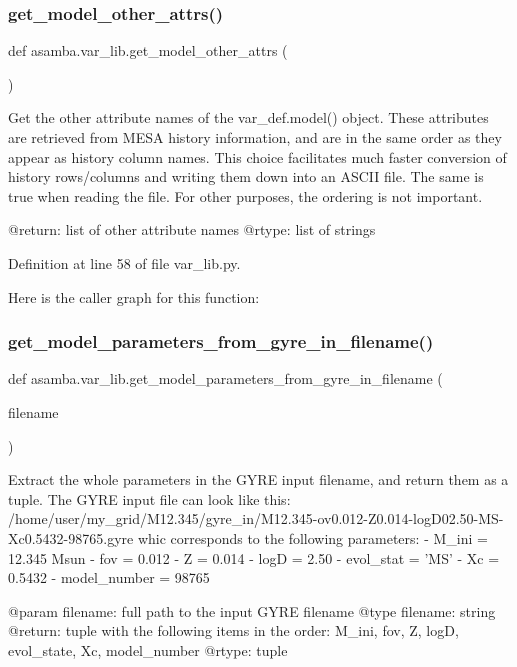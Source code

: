 \subsubsection{\texorpdfstring{get\+\_\+model\+\_\+other\+\_\+attrs()}{get\_model\_other\_attrs()}}
{\footnotesize\ttfamily def asamba.\+var\+\_\+lib.\+get\+\_\+model\+\_\+other\+\_\+attrs (\begin{DoxyParamCaption}{ }\end{DoxyParamCaption})}

\begin{DoxyVerb}Get the other attribute names of the var_def.model() object. These attributes are retrieved from
MESA history information, and are in the same order as they appear as history column names. This
choice facilitates much faster conversion of history rows/columns and writing them down into an 
ASCII file. The same is true when reading the file. For other purposes, the ordering is not 
important.

@return: list of other attribute names 
@rtype: list of strings
\end{DoxyVerb}
 

Definition at line 58 of file var\+\_\+lib.\+py.

Here is the caller graph for this function\+:
\mbox{\label{namespaceasamba_1_1var__lib_a48d70ad01935d09c3c0bb434bc82a5e6}} 
\subsubsection{\texorpdfstring{get\+\_\+model\+\_\+parameters\+\_\+from\+\_\+gyre\+\_\+in\+\_\+filename()}{get\_model\_parameters\_from\_gyre\_in\_filename()}}
{\footnotesize\ttfamily def asamba.\+var\+\_\+lib.\+get\+\_\+model\+\_\+parameters\+\_\+from\+\_\+gyre\+\_\+in\+\_\+filename (\begin{DoxyParamCaption}\item[{}]{filename }\end{DoxyParamCaption})}

\begin{DoxyVerb}Extract the whole parameters in the GYRE input filename, and return them as a tuple. The GYRE input
file can look like this:
/home/user/my_grid/M12.345/gyre_in/M12.345-ov0.012-Z0.014-logD02.50-MS-Xc0.5432-98765.gyre
whic corresponds to the following parameters:
- M_ini    = 12.345 Msun
- fov      = 0.012
- Z        = 0.014
- logD     = 2.50
- evol_stat = 'MS'
- Xc       = 0.5432
- model_number = 98765

@param filename: full path to the input GYRE filename
@type filename: string
@return: tuple with the following items in the order: M_ini, fov, Z, logD, evol_state, Xc, model_number
@rtype: tuple
\end{DoxyVerb}
 

